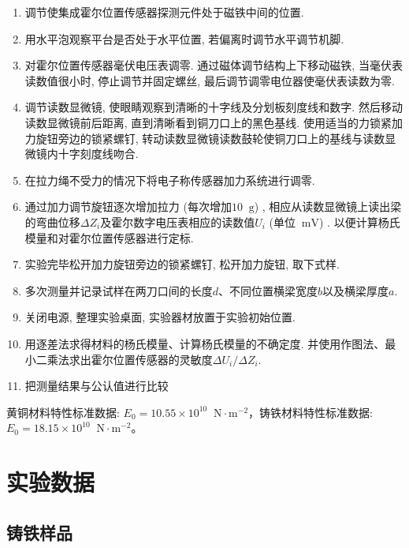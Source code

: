 \documentclass[11pt]{article}
\newcommand*{\unit}[1]{\mathop{}\!\mathrm{#1}}
\begin{document}
\begin{enumerate}
    \item 调节使集成霍尔位置传感器探测元件处于磁铁中间的位置. 
    \item 用水平泡观察平台是否处于水平位置, 若偏离时调节水平调节机脚. 
    \item 对霍尔位置传感器毫伏电压表调零. 通过磁体调节结构上下移动磁铁, 当毫伏表读数值很小时, 停止调节并固定螺丝, 最后调节调零电位器使毫伏表读数为零. 
    \item 调节读数显微镜, 使眼睛观察到清晰的十字线及分划板刻度线和数字. 然后移动读数显微镜前后距离, 直到清晰看到铜刀口上的黑色基线. 使用适当的力锁紧加力旋钮旁边的锁紧螺钉, 转动读数显微镜读数鼓轮使铜刀口上的基线与读数显微镜内十字刻度线吻合. 
    \item 在拉力绳不受力的情况下将电子称传感器加力系统进行调零. 
    \item 通过加力调节旋钮逐次增加拉力 (每次增加$10\unit{g}$) , 相应从读数显微镜上读出梁的弯曲位移$\Delta Z_i$及霍尔数字电压表相应的读数值$U_i$ (单位$\unit{mV}$) . 以便计算杨氏模量和对霍尔位置传感器进行定标. 
    \item 实验完毕松开加力旋钮旁边的锁紧螺钉, 松开加力旋钮, 取下式样. 
    \item 多次测量并记录试样在两刀口间的长度$d$、不同位置横梁宽度$b$以及横梁厚度$a$. 
    \item 关闭电源, 整理实验桌面, 实验器材放置于实验初始位置. 
    \item 用逐差法求得材料的杨氏模量、计算杨氏模量的不确定度. 并使用作图法、最小二乘法求出霍尔位置传感器的灵敏度$\Delta U_i/\Delta Z_i$. 
    \item 把测量结果与公认值进行比较
\end{enumerate}

黄铜材料特性标准数据: $E_0 = 10.55\times 10^{10} \unit{N\cdot m^{-2}}$，铸铁材料特性标准数据: $E_0 = 18.15 \times 10^{10} \unit{N\cdot m^{-2}}$。

\section{实验数据}

\subsection{铸铁样品}
\end{document}
